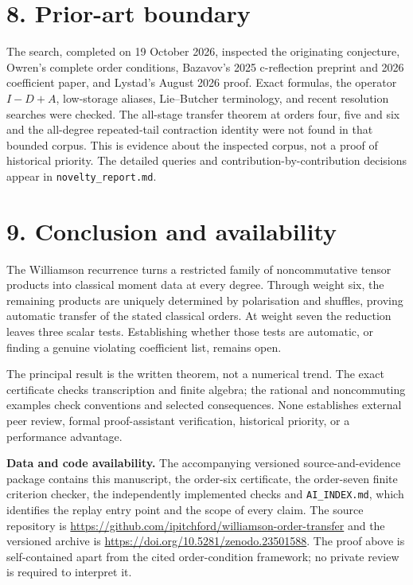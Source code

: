 \documentclass[
  11pt,
  a4paper,
]{scrartcl}
\begin{document}
\section{8. Prior-art boundary}\label{prior-art-boundary}

The search, completed on 19 October 2026, inspected the originating
conjecture, Owren's complete order conditions, Bazavov's 2025
c-reflection preprint and 2026 coefficient paper, and Lystad's August
2026 proof. Exact formulas, the operator \(I-D+A\), low-storage aliases,
Lie--Butcher terminology, and recent resolution searches were checked.
The all-stage transfer theorem at orders four, five and six and the
all-degree repeated-tail contraction identity were not found in that
bounded corpus. This is evidence about the inspected corpus, not a proof
of historical priority. The detailed queries and
contribution-by-contribution decisions appear in
\texttt{novelty\_report.md}.

\section{9. Conclusion and
availability}\label{conclusion-and-availability}

The Williamson recurrence turns a restricted family of noncommutative
tensor products into classical moment data at every degree. Through
weight six, the remaining products are uniquely determined by
polarisation and shuffles, proving automatic transfer of the stated
classical orders. At weight seven the reduction leaves three scalar
tests. Establishing whether those tests are automatic, or finding a
genuine violating coefficient list, remains open.

The principal result is the written theorem, not a numerical trend. The
exact certificate checks transcription and finite algebra; the rational
and noncommuting examples check conventions and selected consequences.
None establishes external peer review, formal proof-assistant
verification, historical priority, or a performance advantage.

\textbf{Data and code availability.} The accompanying versioned
source-and-evidence package contains this manuscript, the order-six
certificate, the order-seven finite criterion checker, the independently
implemented checks and \texttt{AI\_INDEX.md}, which identifies the
replay entry point and the scope of every claim. The source repository
is \url{https://github.com/ipitchford/williamson-order-transfer} and the
versioned archive is \url{https://doi.org/10.5281/zenodo.23501588}. The
proof above is self-contained apart from the cited order-condition
framework; no private review is required to interpret it.
\end{document}
